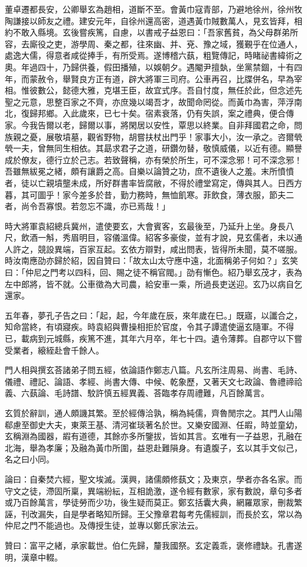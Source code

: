 \begin{pinyinscope}
董卓遷都長安，公卿舉玄為趙相，道斷不至。會黃巾寇青部，乃避地徐州，徐州牧陶謙接以師友之禮。建安元年，自徐州還高密，道遇黃巾賊數萬人，見玄皆拜，相約不敢入縣境。玄後嘗疾篤，自慮，以書戒子益恩曰：「吾家舊貧，為父母群弟所容，去廝役之吏，游學周、秦之都，往來幽、并、兗、豫之域，獲覲乎在位通人，處逸大儒，得意者咸從捧手，有所受焉。遂博稽六蓺，粗覽傳記，時睹祕書緯術之奧。年過四十，乃歸供養，假田播殖，以娛朝夕。遇閹尹擅埶，坐黨禁錮，十有四年，而蒙赦令，舉賢良方正有道，辟大將軍三司府。公車再召，比牒併名，早為宰相。惟彼數公，懿德大雅，克堪王臣，故宜式序。吾自忖度，無任於此，但念述先聖之元意，思整百家之不齊，亦庶幾以竭吾才，故聞命罔從。而黃巾為害，萍浮南北，復歸邦鄉。入此歲來，已七十矣。宿素衰落，仍有失誤，案之禮典，便合傳家。今我告爾以老，歸爾以事，將閑居以安性，覃思以終業。自非拜國君之命，問族親之憂，展敬墳墓，觀省野物，胡嘗扶杖出門乎！家事大小，汝一承之。咨爾煢煢一夫，曾無同生相依。其勗求君子之道，研鑽勿替，敬慎威儀，以近有德。顯譽成於僚友，德行立於己志。若致聲稱，亦有榮於所生，可不深念邪！可不深念邪！吾雖無紱冕之緒，頗有讓爵之高。自樂以論贊之功，庶不遺後人之羞。末所憤憤者，徒以亡親墳壟未成，所好群書率皆腐敝，不得於禮堂寫定，傳與其人。日西方暮，其可圖乎！家今差多於昔，勤力務時，無恤飢寒。菲飲食，薄衣服，節夫二者，尚令吾寡恨。若忽忘不識，亦已焉哉！」

時大將軍袁紹總兵冀州，遣使要玄，大會賓客，玄最後至，乃延升上坐。身長八尺，飲酒一斛，秀眉明目，容儀溫偉。紹客多豪俊，並有才說，見玄儒者，未以通人許之，競設異端，百家互起。玄依方辯對，咸出問表，皆得所未聞，莫不嗟服。時汝南應劭亦歸於紹，因自贊曰：「故太山太守應中遠，北面稱弟子何如？」玄笑曰：「仲尼之門考以四科，回、賜之徒不稱官閥。」劭有慚色。紹乃舉玄茂才，表為左中郎將，皆不就。公車徵為大司農，給安車一乘，所過長吏送迎。玄乃以病自乞還家。

五年春，夢孔子告之曰：「起，起，今年歲在辰，來年歲在巳。」既寤，以讖合之，知命當終，有頃寢疾。時袁紹與曹操相拒於官度，令其子譚遣使逼玄隨軍。不得已，載病到元城縣，疾篤不進，其年六月卒，年七十四。遺令薄葬。自郡守以下嘗受業者，縗絰赴會千餘人。

門人相與撰玄荅諸弟子問五經，依論語作鄭志八篇。凡玄所注周易、尚書、毛詩、儀禮、禮記、論語、孝經、尚書大傳、中候、乾象歷，又著天文七政論、魯禮禘祫義、六蓺論、毛詩譜、駮許慎五經異義、荅臨孝存周禮難，凡百餘萬言。

玄質於辭訓，通人頗譏其繁。至於經傳洽孰，稱為純儒，齊魯閒宗之。其門人山陽郗慮至御史大夫，東萊王基、清河崔琰著名於世。又樂安國淵、任嘏，時並童幼，玄稱淵為國器，嘏有道德，其餘亦多所鑒拔，皆如其言。玄唯有一子益恩，孔融在北海，舉為孝廉；及融為黃巾所圍，益恩赴難隕身。有遺腹子，玄以其手文似己，名之曰小同。

論曰：自秦焚六經，聖文埃滅。漢興，諸儒頗修蓺文；及東京，學者亦各名家。而守文之徒，滯固所稟，異端紛紜，互相詭激，遂令經有數家，家有數說，章句多者或乃百餘萬言，學徒勞而少功，後生疑而莫正。鄭玄括囊大典，網羅眾家，刪裁繁誣，刊改漏失，自是學者略知所歸。王父豫章君每考先儒經訓，而長於玄，常以為仲尼之門不能過也。及傳授生徒，並專以鄭氏家法云。

贊曰：富平之緒，承家載世。伯仁先歸，釐我國祭。玄定義乖，褒修禮缺。孔書遂明，漢章中輟。


\end{pinyinscope}
